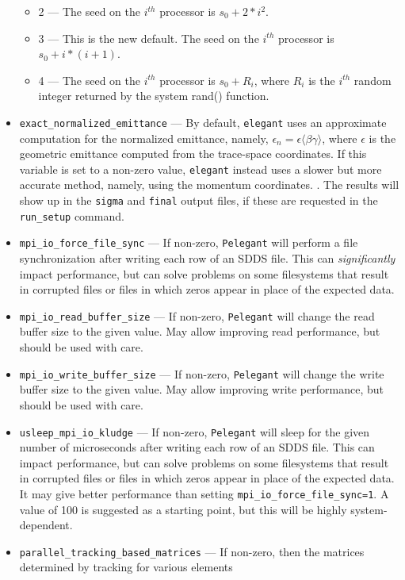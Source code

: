 \documentclass[11pt]{article}
\begin{document}
\begin{itemize}
\begin{itemize}
    \item 2 --- The seed on the $i^{th}$ processor is $s_0+2*i^2$.
    \item 3 --- This is the new default. The seed on the $i^{th}$ processor is $s_0+i*(i+1)$.
    \item 4 --- The seed on the $i^{th}$ processor is $s_0+R_i$, where $R_i$ is the $i^{th}$ random integer returned by
      the system rand() function.
    \end{itemize}
\item \verb|exact_normalized_emittance| --- By default, \verb|elegant| uses an approximate computation for the normalized emittance, namely,
$\epsilon_n = \epsilon\langle\beta\gamma\rangle$, where $\epsilon$ is the geometric emittance computed from the trace-space coordinates.
If this variable is set to a non-zero value, \verb|elegant| instead uses a slower but more accurate method, namely, using the momentum coordinates.
\cite{Floettmann-PRSTAB6-034202}. The results will show up in the \verb|sigma| and \verb|final| output files, if these are requested in the \verb|run_setup| command.
\item \verb|mpi_io_force_file_sync|  --- If non-zero, \verb|Pelegant| will perform a file synchronization after writing each row of
  an SDDS file. This can {\em significantly} impact performance, but can solve problems on some filesystems that result in corrupted files
  or files in which zeros appear in place of the expected data.
\item \verb|mpi_io_read_buffer_size|  --- If non-zero, \verb|Pelegant| will change the read buffer size to the given value. 
  May allow improving read performance, but should be used with care.
\item \verb|mpi_io_write_buffer_size|  --- If non-zero, \verb|Pelegant| will change the write buffer size to the given value. 
  May allow improving write performance, but should be used with care.
\item \verb|usleep_mpi_io_kludge|  --- If non-zero, \verb|Pelegant| will sleep for the given number of microseconds after
  writing each row of an SDDS file. This can impact performance, but can solve problems on some filesystems that result in corrupted files
  or files in which zeros appear in place of the expected data.
  It may give better performance than setting \verb|mpi_io_force_file_sync=1|.
  A value of 100 is suggested as a starting point, but this will be highly system-dependent.
\item \verb|parallel_tracking_based_matrices| --- If non-zero, then the matrices determined by tracking for various elements

\end{itemize}
\end{document}
